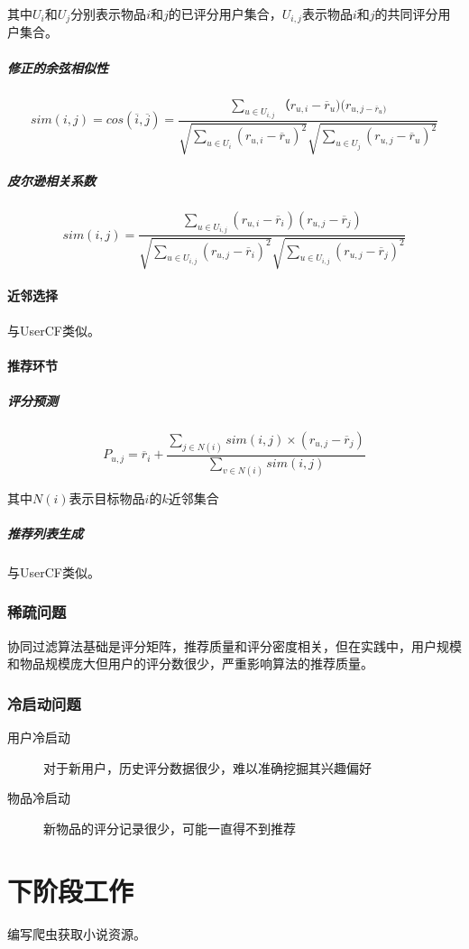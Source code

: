 \documentclass{upctrans}
\begin{document}
其中$U_i$和$U_j$分别表示物品$i$和$j$的已评分用户集合，$U_{i,j}$表示物品$i$和$j$的共同评分用户集合。

\subparagraph{修正的余弦相似性}

\begin{equation*}
    sim(i,j)
    =cos(\overline{i},\overline{j})
    =\frac{\sum\limits_{u\in{U_{i,j}}}
    （r_{u,i}-\overline{r}_u)(r_{u,j-\overline{r}_u)}
    }{\sqrt{\sum\limits_{u\in{U_i}}(r_{u,i}-\overline{r}_u)^2}\sqrt{\sum\limits_{u\in{U_j}}(r_{u,j}-\overline{r}_u)^2}}
\end{equation*}

\subparagraph{皮尔逊相关系数}

\begin{equation*}
    sim(i,j)=\frac{
        \sum\limits_{u\in{U_{i,j}}}
        (r_{u,i}-\overline{r}_i)
        (r_{u,j}-\overline{r}_j)
    }{
        \sqrt{
            \sum\limits_{u\in{U_{i,j}}}(r_{u,j}-\overline{r}_i)^2
        }
        \sqrt{
            \sum\limits_{u\in{U_{i,j}}}(r_{u,j}-\overline{r}_j)^2
        }
    }
\end{equation*}

\paragraph{近邻选择}

与UserCF类似。

\paragraph{推荐环节}
\subparagraph{评分预测}

\begin{equation*}
    P_{u,j}=\overline{r}_i+
    \frac{
        \sum\limits_{j\in{N(i)}}
        sim(i,j)\times (r_{u,j}-\overline{r}_j)
    }{
        \sum\limits_{v\in{N(i)}}
        sim(i,j)
    }
\end{equation*}

其中$N(i)$表示目标物品$i$的$k$近邻集合

\subparagraph{推荐列表生成}

与UserCF类似。

\subsubsection{稀疏问题}

协同过滤算法基础是评分矩阵，推荐质量和评分密度相关，但在实践中，用户规模和物品规模庞大但用户的评分数很少，严重影响算法的推荐质量。

\subsubsection{冷启动问题}

\begin{description}
    \item[用户冷启动] 对于新用户，历史评分数据很少，难以准确挖掘其兴趣偏好
    \item[物品冷启动] 新物品的评分记录很少，可能一直得不到推荐  
\end{description}

\section{下阶段工作}

编写爬虫获取小说资源。

    
\end{document}
